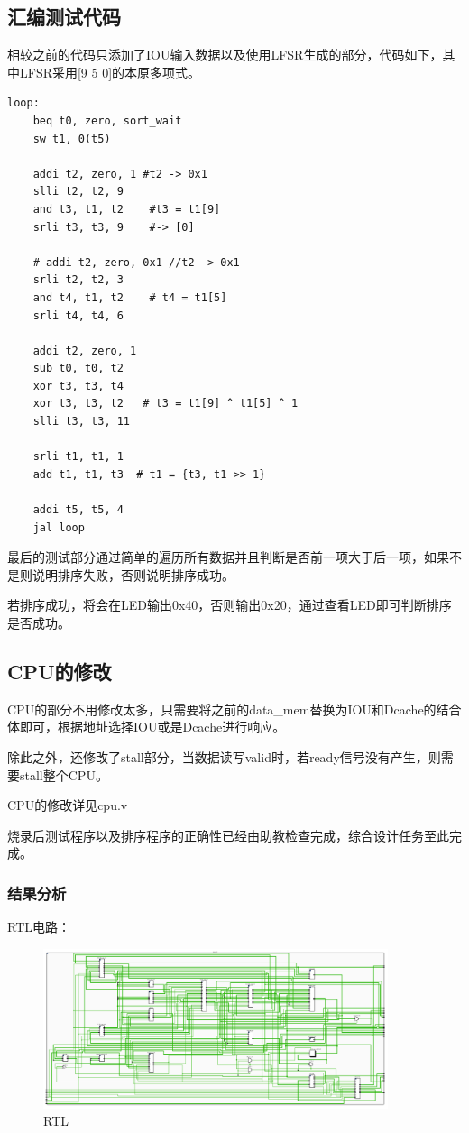 \documentclass[a4paper]{article}
\begin{document}
\subsection{汇编测试代码}
相较之前的代码只添加了IOU输入数据以及使用LFSR生成的部分，代码如下，其中LFSR采用[9 5 0]的本原多项式。
\begin{lstlisting}[language={[RISC-V]Assembler},title={test.asm}]
    loop: 
    beq t0, zero, sort_wait
    sw t1, 0(t5)

    addi t2, zero, 1 #t2 -> 0x1
    slli t2, t2, 9
    and t3, t1, t2    #t3 = t1[9]
    srli t3, t3, 9    #-> [0]

    # addi t2, zero, 0x1 //t2 -> 0x1
    srli t2, t2, 3
    and t4, t1, t2    # t4 = t1[5]
    srli t4, t4, 6    

    addi t2, zero, 1 
    sub t0, t0, t2
    xor t3, t3, t4
    xor t3, t3, t2   # t3 = t1[9] ^ t1[5] ^ 1
    slli t3, t3, 11

    srli t1, t1, 1
    add t1, t1, t3  # t1 = {t3, t1 >> 1}

    addi t5, t5, 4
    jal loop
\end{lstlisting}  

最后的测试部分通过简单的遍历所有数据并且判断是否前一项大于后一项，如果不是则说明排序失败，否则说明排序成功。

若排序成功，将会在LED输出0x40，否则输出0x20，通过查看LED即可判断排序是否成功。

\subsection{CPU的修改}
CPU的部分不用修改太多，只需要将之前的data\_mem替换为IOU和Dcache的结合体即可，根据地址选择IOU或是Dcache进行响应。

除此之外，还修改了stall部分，当数据读写valid时，若ready信号没有产生，则需要stall整个CPU。

CPU的修改详见cpu.v

烧录后测试程序以及排序程序的正确性已经由助教检查完成，综合设计任务至此完成。

\subsubsection{结果分析}
RTL电路：
\begin{figure}[H]
    \centering
    \includegraphics[width=0.9\textwidth]{3.png}
    \caption{RTL}
    \label{fig:test1}
\end{figure}
\end{document}
